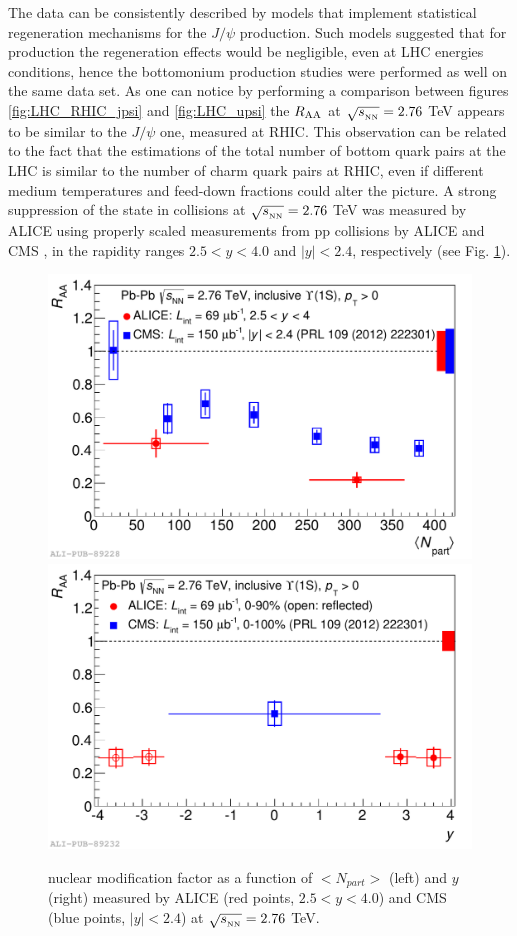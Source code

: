 The data can be consistently described by models that implement statistical regeneration mechanisms for the $J/\psi$ production.
Such models suggested that for \upsis production the regeneration effects would be negligible, even at LHC energies conditions, hence the bottomonium production studies were performed as well on the same data set.
As one can notice by performing a comparison between figures \ref{fig:LHC_RHIC_jpsi} and \ref{fig:LHC_upsi} the \upsi $R_{\rm{AA}}$ at $\sqrt{s_{_{\rm NN}}}=2.76$ TeV appears to be similar to the $J/\psi$ one, measured at RHIC.
This observation can be related to the fact that the estimations of the total number of bottom quark pairs at the LHC is similar to the number of charm quark pairs at RHIC, even if different medium temperatures and feed-down fractions could alter the picture.
A strong suppression of the \upsis state in \pbpb collisions at $\sqrt{s_{_{\rm NN}}}=2.76$ TeV was measured by ALICE using properly scaled measurements from pp collisions by ALICE \cite{Abelev:2014nua} and CMS \cite{Chatrchyan:2012lxa,Khachatryan:2016xxp}, in the rapidity ranges $2.5<y<4.0$ and $|y|<2.4$, respectively (see Fig. \ref{fig:ALICE_CMS_upsi}). 

\begin{figure}[!t]
\begin{center}
\includegraphics[width=0.47\linewidth]{Chapters/Analysis/Figs/2014-Nov-05-Raa_CMS_centr.pdf}
\includegraphics[width=0.47\linewidth]{Chapters/Analysis/Figs/2014-Nov-05-Raa_CMS_rap.pdf}
\caption{\upsis nuclear modification factor as a function of $<N_{part}>$ (left) and $y$ (right) measured by ALICE (red points, $2.5<y<4.0$) and CMS (blue points, $|y|<2.4$) at $\sqrt{s_{_{\rm NN}}}=2.76$ TeV.}
\label{fig:ALICE_CMS_upsi}
\end{center}
\end{figure}

